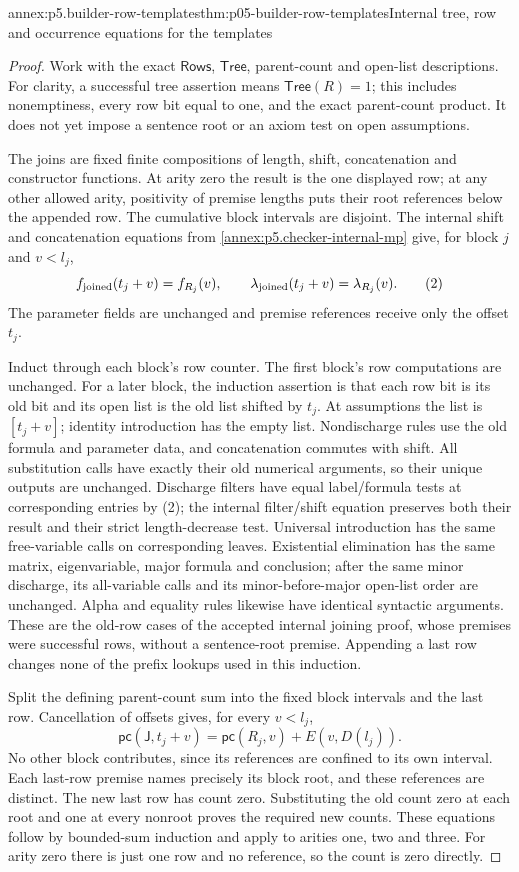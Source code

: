 \begin{annexitem}{annex:p5.builder-row-templates}{thm:p05-builder-row-templates}{Internal tree, row and occurrence equations for the templates}
\begin{proof}
Work with the exact \(\mathsf{Rows}\), \(\mathsf{Tree}\), parent-count
and open-list descriptions. For clarity, a successful tree assertion means
\(\mathsf{Tree}(R)=1\); this includes nonemptiness, every row bit equal
to one, and the exact parent-count product. It does not yet impose a
sentence root or an axiom test on open assumptions.

The joins are fixed finite compositions of length, shift, concatenation and
constructor functions. At arity zero the result is the one displayed row;
at any other allowed arity, positivity of premise lengths puts their root
references below the appended row. The cumulative block intervals are
disjoint. The internal shift and concatenation equations from
\cref{annex:p5.checker-internal-mp} give, for block \(j\) and \(v<l_j\),
\[
 f_{\rm joined}(t_j+v)=f_{R_j}(v),\qquad
 \lambda_{\rm joined}(t_j+v)=\lambda_{R_j}(v).
\tag{2}
\]
The parameter fields are unchanged and premise references receive only the
offset \(t_j\).

Induct through each block's row counter. The first block's row computations
are unchanged. For a later block, the induction assertion is that each row
bit is its old bit and its open list is the old list shifted by \(t_j\).
At assumptions the list is \([t_j+v]\); identity introduction has the empty
list. Nondischarge rules use the old formula and parameter data, and
concatenation commutes with shift. All substitution calls have exactly their
old numerical arguments, so their unique outputs are unchanged. Discharge
filters have equal label/formula tests at corresponding entries by (2);
the internal filter/shift equation preserves both their result and their
strict length-decrease test. Universal introduction has the same free-variable
calls on corresponding leaves. Existential elimination has the same matrix,
eigenvariable, major formula and conclusion; after the same minor discharge,
its all-variable calls and its minor-before-major open-list order are
unchanged. Alpha and equality rules likewise have identical syntactic
arguments. These are the old-row cases of the accepted internal joining
proof, whose premises were successful rows, without a sentence-root premise.
Appending a last row changes none of the prefix lookups used in this induction.

Split the defining parent-count sum into the fixed block intervals and the
last row. Cancellation of offsets gives, for every \(v<l_j\),
\[
 \mathsf{pc}(\mathsf J,t_j+v)
       =\mathsf{pc}(R_j,v)+E(v,D(l_j)).
\tag{3}
\]
No other block contributes, since its references are confined to its own
interval. Each last-row premise names precisely its block root, and these
references are distinct. The new last row has count zero. Substituting the
old count zero at each root and one at every nonroot proves the required
new counts. These equations follow by bounded-sum induction and apply to
arities one, two and three. For arity zero there is just one row and no
reference, so the count is zero directly.


\end{proof}
\end{annexitem}
